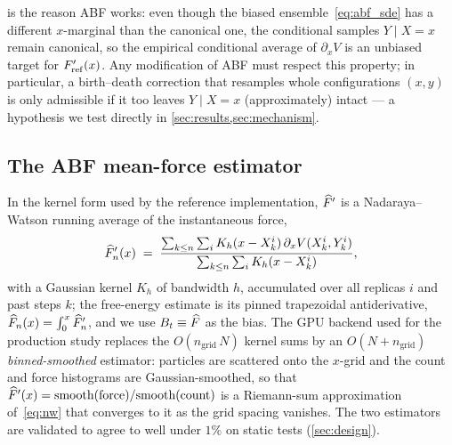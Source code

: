  is the reason ABF works: even though the biased
ensemble~\eqref{eq:abf_sde} has a different $x$-marginal than the canonical
one, the conditional samples $Y\mid X=x$ remain canonical, so the empirical
conditional average of $\partial_x V$ is an unbiased target for
$F'_{\mathrm{ref}}(x)$. Any modification of ABF must respect this property; in particular,
a birth--death correction that resamples whole configurations $(x,y)$ is
only admissible if it too leaves $Y\mid X=x$ (approximately) intact ---
a hypothesis we test directly in \cref{sec:results,sec:mechanism}.

\subsection{The ABF mean-force estimator}
\label{sec:abf_estimator}
In the kernel form used by the reference implementation, $\widehat{F}'$ is a
Nadaraya--Watson running average of the instantaneous force,
\begin{equation}
  \widehat{F}'_n(x) \;=\;
  \frac{\sum_{k\le n}\sum_i K_h(x-X_k^i)\,\partial_x V(X_k^i,Y_k^i)}
       {\sum_{k\le n}\sum_i K_h(x-X_k^i)},
  \label{eq:nw}
\end{equation}
with a Gaussian kernel $K_h$ of bandwidth $h$, accumulated over all replicas
$i$ and past steps $k$; the free-energy estimate is its pinned trapezoidal
antiderivative, $\widehat{F}_n(x)=\int_0^x\widehat{F}'_n$, and we use $B_t\equiv\widehat{F}$ as
the bias. The GPU backend used for the production study replaces the
$O(n_{\mathrm{grid}}\,N)$ kernel sums by an $O(N+n_{\mathrm{grid}})$
\emph{binned-smoothed} estimator: particles are scattered onto the $x$-grid and
the count and force histograms are Gaussian-smoothed, so that
$\widehat{F}'(x)=\mathrm{smooth(force)}/\mathrm{smooth(count)}$ is a Riemann-sum
approximation of~\eqref{eq:nw} that converges to it as the grid spacing
vanishes. The two estimators are validated to agree to well under $1\%$ on
static tests (\cref{sec:design}).
